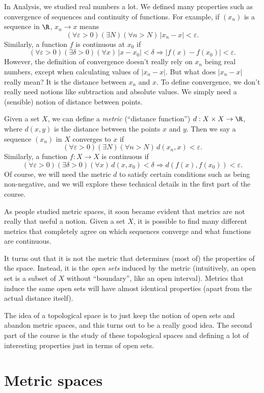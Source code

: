 \documentclass[a4paper]{article}
\begin{document}
In Analysis, we studied real numbers a lot. We defined many properties such as convergence of sequences and continuity of functions. For example, if $(x_n)$ is a sequence in $\R$, $x_n \to x$ means
\[
  (\forall \varepsilon > 0)(\exists N)(\forall n > N)\, |x_n - x| < \varepsilon.
\]
Similarly, a function $f$ is continuous at $x_0$ if
\[
  (\forall \varepsilon > 0)(\exists \delta > 0)(\forall x)\,|x - x_0| < \delta \Rightarrow |f(x) - f(x_0)| < \varepsilon.
\]
However, the definition of convergence doesn't really rely on $x_n$ being real numbers, except when calculating values of $|x_n - x|$. But what does $|x_n - x|$ really mean? It is the distance between $x_n$ and $x$. To define convergence, we don't really need notions like subtraction and absolute values. We simply need a (sensible) notion of distance between points.

Given a set $X$, we can define a \emph{metric} (``distance function'') $d: X\times X\to \R$, where $d(x, y)$ is the distance between the points $x$ and $y$. Then we say a sequence $(x_n)$ in $X$ converges to $x$ if
\[
  (\forall \varepsilon > 0)(\exists N)(\forall n > N)\, d(x_n, x) < \varepsilon.
\]
Similarly, a function $f: X\to X$ is continuous if
\[
  (\forall \varepsilon > 0)(\exists \delta > 0)(\forall x)\,d(x, x_0) < \delta \Rightarrow d(f(x), f(x_0)) < \varepsilon.
\]
Of course, we will need the metric $d$ to satisfy certain conditions such as being non-negative, and we will explore these technical details in the first part of the course.

As people studied metric spaces, it soon became evident that metrics are not really that useful a notion. Given a set $X$, it is possible to find many different metrics that completely agree on which sequences converge and what functions are continuous.

It turns out that it is not the metric that determines (most of) the properties of the space. Instead, it is the \emph{open sets} induced by the metric (intuitively, an open set is a subset of $X$ without ``boundary'', like an open interval). Metrics that induce the same open sets will have almost identical properties (apart from the actual distance itself).

The idea of a topological space is to just keep the notion of open sets and abandon metric spaces, and this turns out to be a really good idea. The second part of the course is the study of these topological spaces and defining a lot of interesting properties just in terms of open sets.

\section{Metric spaces}
\end{document}
